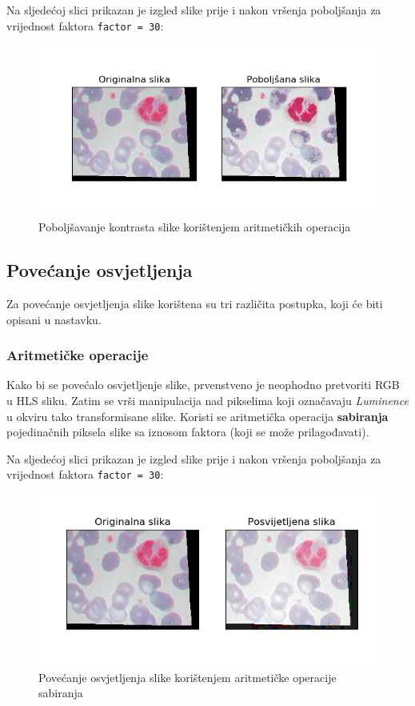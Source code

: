 \documentclass[12pt,a4paper]{article}
\begin{document}
Na sljedećoj slici prikazan je izgled slike prije i nakon vršenja poboljšanja za vrijednost faktora \texttt{factor = 30}:

\begin{figure}[H]

\center
\includegraphics[scale=0.9]{s3Kontrast1.png}
\caption{Poboljšavanje kontrasta slike korištenjem aritmetičkih operacija}

\end{figure}

\subsection{Povećanje osvjetljenja}

Za povećanje osvjetljenja slike korištena su tri različita postupka, koji će biti opisani u nastavku.

\subsubsection{Aritmetičke operacije}

Kako bi se povećalo osvjetljenje slike, prvenstveno je neophodno pretvoriti RGB u HLS sliku. Zatim se vrši manipulacija nad pikselima koji označavaju \textit{Luminence} u okviru tako transformisane slike. Koristi se aritmetička operacija \textbf{sabiranja} pojedinačnih piksela slike sa iznosom faktora (koji se može prilagođavati).


Na sljedećoj slici prikazan je izgled slike prije i nakon vršenja poboljšanja za vrijednost faktora \texttt{factor = 30}:

\begin{figure}[H]

\center
\includegraphics[scale=0.9]{s6Osvjetljenje1.png}
\caption{Povećanje osvjetljenja slike korištenjem aritmetičke operacije sabiranja}

\end{figure}
\end{document}
